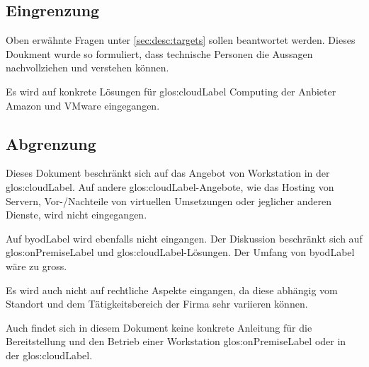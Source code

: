 \subsection{Eingrenzung}

Oben erwähnte Fragen unter \cref{sec:desc:targets} sollen beantwortet werden.
Dieses Doukment wurde so formuliert, dass technische Personen die Aussagen nachvollziehen und verstehen können.

Es wird auf konkrete Lösungen für \Gls{glos:cloudLabel} Computing der Anbieter Amazon und VMware eingegangen.

\subsection{Abgrenzung}
Dieses Dokument beschränkt sich auf das Angebot von Workstation in der \Gls{glos:cloudLabel}. Auf andere \Gls{glos:cloudLabel}-Angebote, wie das Hosting von Servern, Vor-/Nachteile von virtuellen Umsetzungen oder jeglicher anderen Dienste, wird nicht eingegangen.

Auf \Gls{byodLabel} wird ebenfalls nicht eingangen. Der Diskussion beschränkt sich auf \gls{glos:onPremiseLabel} und \Gls{glos:cloudLabel}-Lösungen. Der Umfang von \Gls{byodLabel} wäre zu gross.

Es wird auch nicht auf rechtliche Aspekte eingangen, da diese abhängig vom Standort und dem Tätigkeitsbereich der Firma sehr variieren können.

Auch findet sich in diesem Dokument keine konkrete Anleitung für die Bereitstellung und den Betrieb einer Workstation \gls{glos:onPremiseLabel} oder in der \Gls{glos:cloudLabel}.

